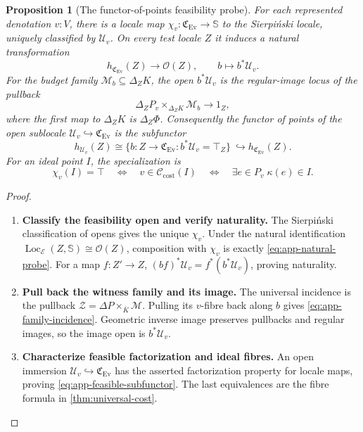 \documentclass[11pt,a4paper]{article}
\numberwithin{algorithm}{section}
\numberwithin{equation}{section}
\newtheorem{proposition}[proposition]{Proposition}
\theoremstyle{definition}
\theoremstyle{remark}
\theoremstyle{plain}
\newcommand{\E}{\mathcal E}
\newcommand{\OO}{\mathcal O}
\newcommand{\incl}{\hookrightarrow}
\newcommand{\Loc}{\operatorname{Loc}}
\newcommand{\Ev}{{\operatorname{Ev}}}
\newcommand{\CostClass}{\mathcal C_{\mathrm{cost}}}
\newcommand{\Cplx}{\mathfrak C_{\Ev}}
\theoremstyle{definition}
\theoremstyle{plain}
\begin{document}
\begin{proposition}[The functor-of-points feasibility probe]
\label{prop:app-feasibility-probe}
For each represented denotation $v:V$, there is a locale map
$\chi_v:\Cplx\to\mathbb S$ to the Sierpi\'nski locale, uniquely
classified by $\mathcal U_v$.  On every test locale $Z$ it induces
a natural transformation
\begin{equation}\label{eq:app-natural-probe}
 h_{\Cplx}(Z)\longrightarrow\OO(Z),
 \qquad b\longmapsto b^*\mathcal U_v.
\end{equation}
For the budget family $\mathscr M_b\subseteq\Delta_ZK$, the open
$b^*\mathcal U_v$ is the regular-image locus of the pullback
\begin{equation}\label{eq:app-family-incidence}
 \Delta_ZP_v\times_{\Delta_ZK}\mathscr M_b
 \longrightarrow 1_Z,
\end{equation}
where the first map to $\Delta_ZK$ is $\Delta_Z\Phi$.
Consequently the functor of points of the open sublocale
$\mathcal U_v\incl\Cplx$ is the subfunctor
\begin{equation}\label{eq:app-feasible-subfunctor}
 h_{\mathcal U_v}(Z)
 \cong\{b:Z\to\Cplx:b^*\mathcal U_v=\top_Z\}
 \ \incl h_{\Cplx}(Z).
\end{equation}
For an ideal point $I$, the specialization is
\[
 \chi_v(I)=\top\quad\Longleftrightarrow\quad
 v\in\CostClass(I)
 \quad\Longleftrightarrow\quad
 \exists e\in P_v\;\kappa(e)\in I.
\]
\end{proposition}
\begin{proof}\leavevmode
\begin{enumerate}[leftmargin=*,align=left]
\item \textbf{Classify the feasibility open and verify naturality.}
The Sierpi\'nski classification of opens gives the unique $\chi_v$.
Under the natural identification
$\Loc_\E(Z,\mathbb S)\cong\OO(Z)$, composition with $\chi_v$
is exactly \eqref{eq:app-natural-probe}.  For a map $f:Z'\to Z$,
$(bf)^*\mathcal U_v=f^*(b^*\mathcal U_v)$, proving naturality.

\item \textbf{Pull back the witness family and its image.}
The universal incidence is the pullback
$\mathscr Z=\Delta P\times_{\bar K}\mathscr M$.
Pulling its $v$-fibre back along $b$ gives
\eqref{eq:app-family-incidence}.  Geometric inverse image preserves
pullbacks and regular images, so the image open is $b^*\mathcal U_v$.

\item \textbf{Characterize feasible factorization and ideal fibres.}
An open immersion $\mathcal U_v\incl\Cplx$ has the asserted
factorization property for locale maps, proving
\eqref{eq:app-feasible-subfunctor}.  The last equivalences are the
fibre formula in \cref{thm:universal-cost}.
\end{enumerate}
\end{proof}
\end{document}
